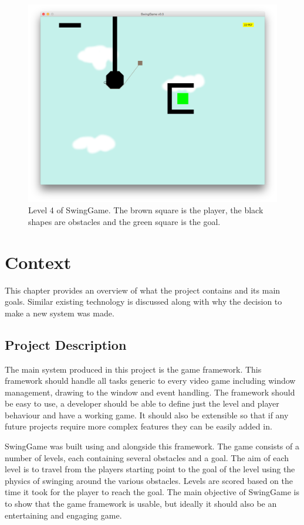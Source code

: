 \documentclass[]{report}
\begin{document}
\begin{figure}[H]
	\centerline{\includegraphics[width=1.5\textwidth]{sgexample}}
	\caption{Level 4 of SwingGame. The brown square is the player, the black shapes are obstacles and the green square is the goal.}
	\label{sgexample}
\end{figure}

\chapter{Context}
This chapter provides an overview of what the project contains and its main goals. Similar existing technology is discussed along with why the decision to make a new system was made.
	\section{Project Description}
	The main system produced in this project is the game framework. This framework should handle all tasks generic to every video game including window management, drawing to the window and event handling. The framework should be easy to use, a developer should be able to define just the level and player behaviour and have a working game. It should also be extensible so that if any future projects require more complex features they can be easily added in.
	
	SwingGame was built using and alongside this framework. The game consists of a number of levels, each containing several obstacles and a goal. The aim of each level is to travel from the players starting point to the goal of the level using the physics of swinging around the various obstacles. Levels are scored based on the time it took for the player to reach the goal. The main objective of SwingGame is to show that the game framework is usable, but ideally it should also be an entertaining and engaging game.
\end{document}
